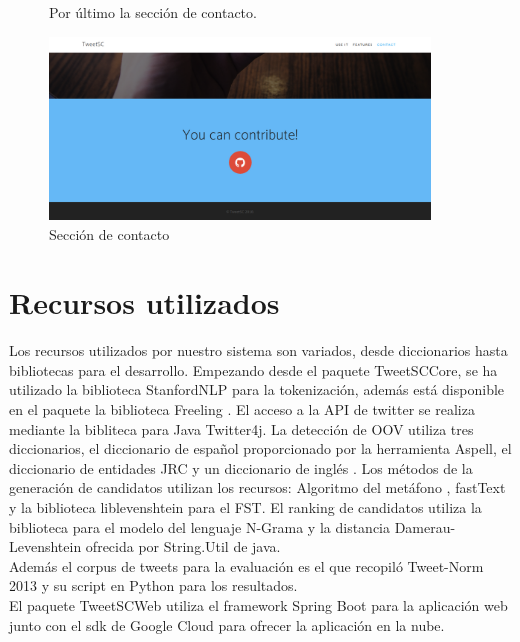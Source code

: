 \documentclass[spanish,12pt, a4paper,twoside]{paper}
\let\oldsection\section
\def\section{\cleardoublepage\oldsection}
\begin{document}
\begin{figure}[h]
Por último la sección de contacto.
\begin{center}
 \includegraphics[width=0.9\textwidth]{recursos/WebContact}
\caption{Sección de contacto}
\label{fig:webcontact}
\end{center}
\end{figure}

\section{Recursos utilizados}\label{sec:recursosutilizados}
Los recursos utilizados por nuestro sistema son variados, desde diccionarios hasta bibliotecas para el desarrollo. Empezando desde el paquete TweetSCCore, se ha utilizado la biblioteca StanfordNLP \cite{stanfordnlp} para la tokenización, además está disponible en el paquete la biblioteca Freeling \cite{freeling}. El acceso a la API de twitter se realiza mediante la bibliteca para Java Twitter4j. La detección de OOV utiliza tres diccionarios, el diccionario de español proporcionado por la herramienta Aspell, el diccionario de entidades JRC y un diccionario de inglés \cite{englishdictionary}. Los métodos de la generación de candidatos utilizan los recursos: Algoritmo del metáfono \cite{mosquera:2011}, fastText \cite{facebook:fasttext} y la biblioteca liblevenshtein \cite{liblevenshtein} para el FST. El ranking de candidatos utiliza la biblioteca \cite{opennlp} para el modelo del lenguaje N-Grama y la distancia Damerau-Levenshtein ofrecida por String.Util de java.\\

Además el corpus de tweets para la evaluación es el que recopiló Tweet-Norm 2013 \cite{alegria:2013} y su script en Python para los resultados.\\

El paquete TweetSCWeb utiliza el framework Spring Boot para la aplicación web junto con el sdk de Google Cloud para ofrecer la aplicación en la nube.
\end{document}
